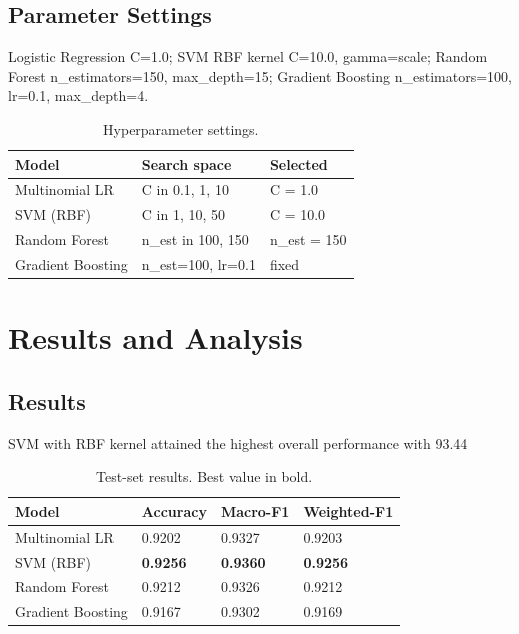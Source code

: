 \documentclass[conference]{IEEEtran}
\begin{document}
\subsection{Parameter Settings}
Logistic Regression C=1.0; SVM RBF kernel C=10.0, gamma=scale; Random Forest n_estimators=150, max_depth=15; Gradient Boosting n_estimators=100, lr=0.1, max_depth=4.

\begin{table}[htbp]
\caption{Hyperparameter settings.}
\label{tab:hyperparameters}
\centering
\begin{tabular}{lll}
\toprule
\textbf{Model} & \textbf{Search space} & \textbf{Selected} \\
\midrule
Multinomial LR & C in {0.1, 1, 10} & C = 1.0 \\
SVM (RBF) & C in {1, 10, 50} & C = 10.0 \\
Random Forest & n\_est in {100, 150} & n\_est = 150 \\
Gradient Boosting & n\_est=100, lr=0.1 & fixed \\
\bottomrule
\end{tabular}
\end{table}

\section{Results and Analysis}
\subsection{Results}
SVM with RBF kernel attained the highest overall performance with 93.44%

\begin{table}[htbp]
\caption{Test-set results. Best value in bold.}
\label{tab:results}
\centering
\begin{tabular}{llll}
\toprule
\textbf{Model} & \textbf{Accuracy} & \textbf{Macro-F1} & \textbf{Weighted-F1} \\
\midrule
Multinomial LR & 0.9202 & 0.9327 & 0.9203 \\
SVM (RBF) & \textbf{0.9256} & \textbf{0.9360} & \textbf{0.9256} \\
Random Forest & 0.9212 & 0.9326 & 0.9212 \\
Gradient Boosting & 0.9167 & 0.9302 & 0.9169 \\
\bottomrule
\end{tabular}
\end{table}
\end{document}
